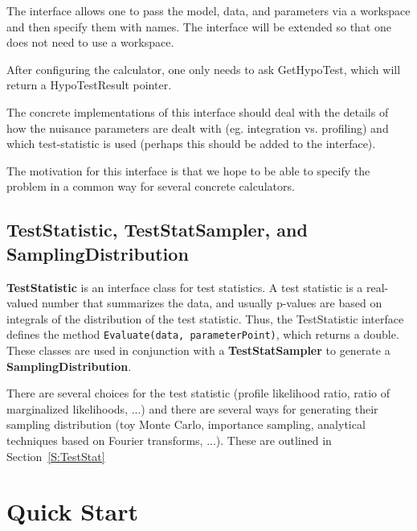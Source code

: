 \documentclass[11pt]{article}
\begin{document}
The interface allows one to pass the model, data, and parameters via a workspace and then specify them with names.
The interface will be extended so that one does not need to use a workspace.

After configuring the calculator, one only needs to ask GetHypoTest, which will return a HypoTestResult pointer.

The concrete implementations of this interface should deal with the details of how the nuisance parameters are
dealt with (eg. integration vs. profiling) and which test-statistic is used (perhaps this should be added to the interface).

The motivation for this interface is that we hope to be able to specify the problem in a common way for several concrete calculators.




\subsection{TestStatistic, TestStatSampler, and  SamplingDistribution}

\textbf{TestStatistic} is an interface class for test statistics.  A test statistic is a real-valued number that summarizes the data, and usually p-values are based on integrals of the distribution of the test statistic. Thus, the TestStatistic interface defines the method \texttt{Evaluate(data, parameterPoint)}, which returns a double.  These classes are used in conjunction with a \textbf{TestStatSampler} to generate a \textbf{SamplingDistribution}.

There are several choices for the test statistic (profile likelihood ratio, ratio of marginalized likelihoods, ...) and there are several ways for generating their sampling distribution (toy Monte Carlo, importance sampling, analytical techniques based on Fourier transforms, ...).  These are outlined in Section~\ref{S:TestStat}









\section{Quick Start}
\end{document}
